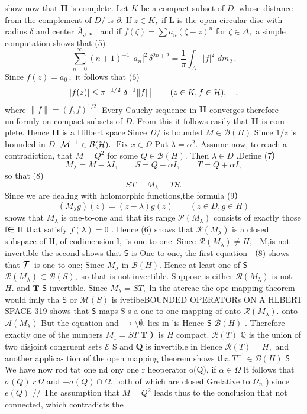 show now that ${\boldsymbol{H}}$ is complete. Let $K$ be a compact subset of $D.$ whose distance from the complement of $D\!\!\!\!/$ is ${\bar{\partial}}.$ If $z\in K,$ if L is the open circular disc with radius $\delta$ and center ${\overline{{A}}}_{\mathrm{J}}$ 。 and if $f(\zeta)=\sum a_{n}(\zeta-z)^{n}$ for $\zeta\in\Delta,$ a simple computation shows that (5) $$ \sum_{n=0}^{\infty}(n+1)^{-1}|\,a_{n}|^{2}\,\delta^{2n+2}=\frac{1}{\pi}\int_{\Delta}|f|^{2}\,\,d m_{2}\,. $$ Since $f(z)=a_{0}\,,$ it follows that (6) $$ |f(z)|\le\pi^{-1/2}\left.\delta^{-1}\|f\|\right|\qquad(z\in K,f\in{\cal H}),\quad. $$ where $\|f\|=(f,f)^{1/2}.$ Every Cauchy sequence in ${\boldsymbol{H}}$ converges therefore uniformly on compact subsets of $D.$ From this it follows easily that ${\boldsymbol{H}}$ is com- plete. Hence ${\boldsymbol{H}}$ is a Hilbert space Since $D\!\!\!\!/$ is bounded $M\in{\mathcal{B}}(H)$ Since $1/z$ is bounded in $D_{\cdot}$ ${\cal M}^{-1}\in\mathcal{B}({\cal H}).$ $\operatorname{Fix}x\in\Omega$ Put $\lambda=\alpha^{2}.$ Assume now, to reach a contradiction, that $M=Q^{2}$ for some $Q\in{\mathcal{B}}(H).$ Then $\lambda\in D$ .Define (7） $$ M_{\lambda}=M-\lambda I,\qquad S=Q-\alpha I,\qquad T=Q+\alpha I, $$ so that (8) $$ S T=M_{\lambda}=T S. $$ Since we are dealing with holomorphic functions,the formula (9） $$ (M_{\lambda}g)(z)=(z-\lambda)g(z)\qquad(z\in D,g\in H) $$ shows that $M_{\lambda}$ is one-to-one and that its range ${\mathcal{P}}(M_{\lambda})$ consists of exactly those f∈ H that satisfy $f(\lambda)=0$ . Hence (6) shows that ${\mathcal{R}}(M_{\lambda})$ is a closed subspace of H, of codimension ${\textbf{l}},$ is one-to-one. Sincc ${\mathcal R}(M_{\lambda})\neq H,\,.$ M,is not invertible the second shows that $\boldsymbol{\mathsf{S}}$ is One-to-one, the first equation （8) shows that ${\cal T}\,$ is one-to-one; Since $M_{\lambda}$ in ${\mathcal{B}}(H).$ Hence at least one of $\boldsymbol{\mathsf{S}}$ $\mathcal{R}(M_{\lambda})\subset\mathcal{B}(S),$ so that is not invertible. Suppose is either ${\mathcal{R}}(M_{\lambda})$ is not $H.$ and ${\boldsymbol{T}}$ $\boldsymbol{\mathsf{S}}$ invertible. Since $M_{\lambda}=S T,$ ln the atereae the ope mapping theorem would imly tha $\boldsymbol{\mathsf{S}}$ or ${\mathcal{M}}(S)$ is ivetibeBOUNDED OPERATORs ON A HLBERT SPACE 319 shows that $\boldsymbol{\mathsf{S}}$ maps S s a one-to-one mapping of onto ${\mathcal{R}}(M_{\lambda}).$ onto ${\mathcal{A}}(M_{\lambda})$ But the equation and $\longrightarrow\setminus\emptyset.$ lies in 'is Hcnce $\boldsymbol{\mathsf{S}}$ ${\mathcal{B}}(H)$ . Therefore exactly one of the numbers $M_{1}=S T$ ${\boldsymbol{T}}$ ）is $\textstyle H$ compact. ${\mathcal{R}}(T)$ $\mathbb{Q}$ is the union of two disjoint congruent sets $\textstyle{\mathcal{E}}$ S and $\mathbf{Q}$ is invertible in Hence ${\mathcal{R}}(T)=H,$ and another applica- tion of the open mapping theorem shows tha $T^{-1}\in{\mathcal{B}}(H)$ $\boldsymbol{\mathsf{S}}$ We have now rod tat one nd ony one r heoperator o(Q), if $\alpha\in\Omega$ lt follows that $\sigma(Q)\ r\,\Omega$ and $-\sigma(Q)\cap\Omega.$ both of which are closed Grelative to $\Omega{}_{n}$ ) since $e(Q)$ // The assumption that $M=Q^{2}$ leads thus to the conclusion that not connected, which contradicts the 